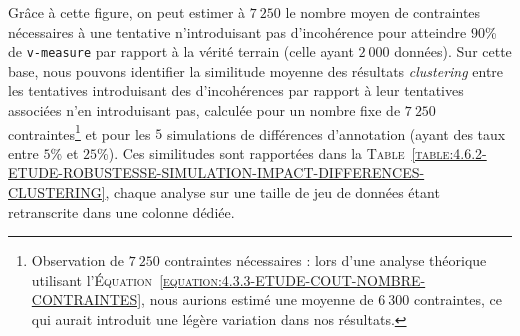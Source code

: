 			
			
			Grâce à cette figure, on peut estimer à $7~250$ le nombre moyen de contraintes nécessaires à une tentative n'introduisant pas d'incohérence pour atteindre $90$\% de \texttt{v-measure} par rapport à la vérité terrain (celle ayant $2~000$ données).
			Sur cette base, nous pouvons identifier la similitude moyenne des résultats \textit{clustering} entre les tentatives introduisant des d'incohérences par rapport à leur tentatives associées n'en introduisant pas, calculée pour un nombre fixe de $7~250$ contraintes\footnote{
				Observation de $7~250$ contraintes nécessaires : lors d'une analyse théorique utilisant l'\textsc{Équation~\ref{equation:4.3.3-ETUDE-COUT-NOMBRE-CONTRAINTES}}, nous aurions estimé une moyenne de $6~300$ contraintes, ce qui aurait introduit une légère variation dans nos résultats.
			} et pour les $5$ simulations de différences d'annotation (ayant des taux entre $5$\% et $25$\%).
			Ces similitudes sont rapportées dans la \textsc{Table~\ref{table:4.6.2-ETUDE-ROBUSTESSE-SIMULATION-IMPACT-DIFFERENCES-CLUSTERING}}, chaque analyse sur une taille de jeu de données étant retranscrite dans une colonne dédiée.
			
